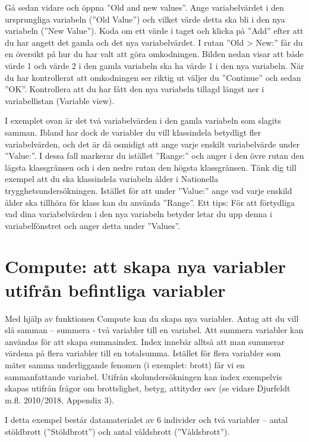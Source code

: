 \documentclass[
]{book}
\begin{document}
Gå sedan vidare och öppna ''Old and new values''. Ange variabelvärdet i den ursprungliga variabeln
(''Old Value'') och vilket värde detta ska bli i den nya variabeln (''New Value''). Koda om ett värde i
taget och klicka på ''Add'' efter att du har angett det gamla och det nya variabelvärdet. I rutan ''Old \textgreater{} New:''
får du en översikt på hur du har valt att göra omkodningen. Bilden nedan visar att både
värde 1 och värde 2 i den gamla variabeln ska ha värde 1 i den nya variabeln. När du har
kontrollerat att omkodningen ser riktig ut väljer du ''Continue'' och sedan ''OK''. Kontrollera att du
har fått den nya variabeln tillagd längst ner i variabellistan (Variable view).

I exemplet ovan är det två variabelvärden i den gamla variabeln som slagits samman. Ibland har dock de
variabler du vill klassindela betydligt fler variabelvärden, och det är då osmidigt att ange varje enskilt
variabelvärde under ''Value:''. I dessa fall markerar du istället ''Range:'' och anger i den övre rutan den
lägsta klassgränsen och i den nedre rutan den högsta klassgränsen. Tänk dig till exempel att du ska
klassindela variabeln ålder i Nationella trygghetsundersökningen. Istället för att under ''Value:'' ange
vad varje enskild ålder ska tillhöra för klass kan du använda ''Range''. Ett tips: För att förtydliga vad dina
variabelvärden i den nya variabeln betyder letar du upp denna i variabelfönstret och anger detta under
''Values''.

\hypertarget{compute-att-skapa-nya-variabler-utifruxe5n-befintliga-variabler}{%
\section{Compute: att skapa nya variabler utifrån befintliga variabler}\label{compute-att-skapa-nya-variabler-utifruxe5n-befintliga-variabler}}

Med hjälp av funktionen Compute kan du skapa nya variabler. Antag att du vill slå samman -- summera -
två variabler till en variabel. Att summera variabler kan användas för att skapa summaindex. Index
innebär alltså att man summerar värdena på flera variabler till en totalsumma. Istället för flera variabler
som mäter samma underliggande fenomen (i exemplet: brott) får vi en sammanfattande variabel.
Utifrån skolundersökningen kan index exempelvis skapas utifrån frågor om brottslighet, betyg, attityder
osv (se vidare Djurfeldt m.fl. 2010/2018, Appendix 3).

I detta exempel består datamaterialet av 6 individer och två variabler -- antal stöldbrott (''Stöldbrott'')
och antal våldsbrott (''Våldsbrott'').
\end{document}
